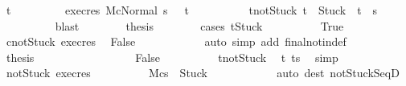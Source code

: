 \begin{isabellebody}
\ t{\isacharprime}\ \isanewline
\ \ \ \ \ \ \ \ exec{\isacharunderscore}res{\isacharcolon}\ {\isachardoublequoteopen}{\isasymGamma}{\isacharbar}\isactrlbsub M\isactrlesub {\isasymturnstile}{\isasymlangle}c{}{\isacharcomma}Normal\ s\ {\isasymrangle}\ {\isasymRightarrow}\ t{\isacharprime}{\isachardoublequoteclose}\ \ \isanewline
\ \ \ \ \ \ \ \ t{\isacharprime}{\isacharunderscore}notStuck{\isacharcolon}\ {\isachardoublequoteopen}t{\isacharprime}\ {\isasymnoteq}\ Stuck\ {\isasymlongrightarrow}\ t{\isacharprime}\ {\isacharequal}\ s{\isacharprime}{\isachardoublequoteclose}\isanewline
\ \ \ \ \ \ \ \ \isamarkupfalse%
\ blast\isanewline
\ \ \ \ \ \ \isamarkupfalse%
\ {\isacharquery}thesis\isanewline
\ \ \ \ \ \ \isamarkupfalse%
\ {\isacharparenleft}cases\ {\isachardoublequoteopen}t{\isacharprime}{\isacharequal}Stuck{\isachardoublequoteclose}{\isacharparenright}\isanewline
\ \ \ \ \ \ \ \ \isamarkupfalse%
\ True\isanewline
\ \ \ \ \ \ \ \ \isamarkupfalse%
\ c{}{\isacharunderscore}notStuck\ exec{\isacharunderscore}res\ \isamarkupfalse%
\ {\isachardoublequoteopen}False{\isachardoublequoteclose}\isanewline
\ \ \ \ \ \ \ \ \ \ \isamarkupfalse%
\ {\isacharparenleft}auto\ simp\ add{\isacharcolon}\ final{\isacharunderscore}notin{\isacharunderscore}def{\isacharparenright}\isanewline
\ \ \ \ \ \ \ \ \isamarkupfalse%
\ {\isacharquery}thesis\ \isacommand{{\isachardot}{\isachardot}}\isamarkupfalse%
\isanewline
\ \ \ \ \ \ \isamarkupfalse%
\isanewline
\ \ \ \ \ \ \ \ \isamarkupfalse%
\ False\isanewline
\ \ \ \ \ \ \ \ \isamarkupfalse%
\ t{\isacharprime}{\isacharunderscore}notStuck\ \isamarkupfalse%
\ t{\isacharprime}{\isacharcolon}\ {\isachardoublequoteopen}t{\isacharprime}{\isacharequal}s{\isacharprime}{\isachardoublequoteclose}\ \isamarkupfalse%
\ simp\isanewline
\ \ \ \ \ \ \ \ \isamarkupfalse%
\ not{\isacharunderscore}Stuck\ exec{\isacharunderscore}res\isanewline
\ \ \ \ \ \ \ \ \isamarkupfalse%
\ {\isachardoublequoteopen}{\isasymGamma}{\isacharbar}\isactrlbsub M\isactrlesub {\isasymturnstile}{\isasymlangle}c{}{\isacharcomma}s{\isacharprime}\ {\isasymrangle}\ {\isasymRightarrow}{\isasymnotin}{\isacharbraceleft}Stuck{\isacharbraceright}{\isachardoublequoteclose}\isanewline
\ \ \ \ \ \ \ \ \ \ \isamarkupfalse%
\ {\isacharparenleft}auto\ dest{\isacharcolon}\ notStuck{\isacharunderscore}SeqD{}{\isacharparenright}\ \isanewline

\end{isabellebody}
